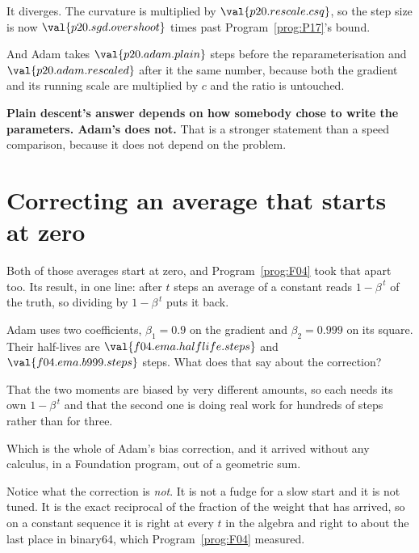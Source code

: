 \begin{fr}
\begin{ansblock}
It diverges. The curvature is multiplied by $\val{p20.rescale.csq}$, so the
step size is now $\val{p20.sgd.overshoot}$ times past
Program~\ref{prog:P17}'s bound.
\end{ansblock}

And Adam takes $\val{p20.adam.plain}$ steps before the reparameterisation and
$\val{p20.adam.rescaled}$ after it \dash{} the same number, because both the
gradient and its running scale are multiplied by $c$ and the ratio is
untouched.

\textbf{Plain descent's answer depends on how somebody chose to write the
parameters. Adam's does not.} That is a stronger statement than a speed
comparison, because it does not depend on the problem.
\end{fr}

\section{Correcting an average that starts at zero}
\label{sec:P20-bias}

\begin{fr}
Both of those averages start at zero, and Program~\ref{prog:F04} took that
apart too. Its result, in one line: after $t$ steps an average of a constant
reads $1 - \beta^{\,t}$ of the truth, so dividing by $1 - \beta^{\,t}$ puts it
back.

Adam uses two coefficients, $\beta_1 = \num{0.9}$ on the gradient and
$\beta_2 = \num{0.999}$ on its square. Their half-lives are
$\val{f04.ema.halflife.steps}$ and $\val{f04.ema.b999.steps}$ steps. What does
that say about the correction?
\dotline
\nextframe
\end{fr}

\begin{fr}
\begin{ansblock}
That the two moments are biased by very different amounts, so each needs its
own $1 - \beta^{\,t}$ \dash{} and that the second one is doing real work for
hundreds of steps rather than for three.
\end{ansblock}

Which is the whole of Adam's bias correction, and it arrived without any
calculus, in a Foundation program, out of a geometric sum.

\begin{note}
Notice what the correction is \emph{not}. It is not a fudge for a slow start
and it is not tuned. It is the exact reciprocal of the fraction of the weight
that has arrived, so on a constant sequence it is right at every $t$ in the
algebra \dash{} and right to about the last place in binary64, which
Program~\ref{prog:F04} measured.
\end{note}
\end{fr}


